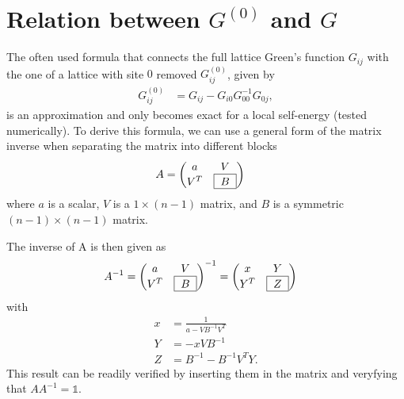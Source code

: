 \documentclass[12pt,a4paper]{scrartcl}
\numberwithin{equation}{section}
\newcommand{\unity}{\mathds{1}}
\begin{document}

\section{Relation between $G^{(0)}$ and $G$}
\label{sec:relation_g(0)_g}
The often used formula that connects the full lattice Green's function
$G_{ij}$ with the one of a lattice with site $0$ removed $G^{(0)}_{ij}$,
given by
\begin{align}
 G^{(0)}_{ij} &= G_{ij} - G_{i0}G^{-1}_{00}G_{0j},
\end{align}
is an approximation and only becomes exact for a local self-energy (tested numerically).
To derive this formula, we can use a general form of the matrix inverse
when separating the matrix into different blocks
\begin{align}
 A&=
\begin{pmatrix}
  a &   V  \\
  V^T & \boxed{ \hspace*{0.1cm} B \hspace*{0.1cm} } 
\end{pmatrix}
\end{align}
where $a$ is a scalar, $V$ is a $1\times (n-1)$ matrix, and 
$B$ is a symmetric $(n-1)\times (n-1)$ matrix.

The inverse of A is then given as 
\begin{align}
 A^{-1}&=
 \begin{pmatrix}
  a &   V  \\
  V^T & \boxed{ \hspace*{0.1cm} B \hspace*{0.1cm} } 
\end{pmatrix}^{-1}
=
\begin{pmatrix}
  x &   Y  \\
  Y^T & \boxed{ \hspace*{0.1cm} Z \hspace*{0.1cm} } 
\end{pmatrix}
\end{align}
with
\begin{align}
 x &= \frac{1}{a - V B^{-1} V^{T}} \\
 Y &= -x V B^{-1} \\
 Z &= B^{-1} - B^{-1} V^{T} Y.
\end{align}
This result can be readily verified by inserting them in the matrix and veryfying that
$AA^{-1}=\unity$.
\end{document}
